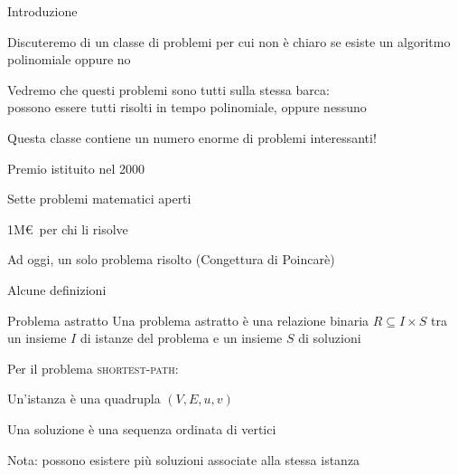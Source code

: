 \begin{frame}{Introduzione}

\BIL
\item Discuteremo di un classe di problemi per cui non è chiaro se esiste
un algoritmo polinomiale oppure no
\item Vedremo che questi problemi sono tutti sulla stessa barca:\\
  possono essere tutti risolti in tempo polinomiale, oppure nessuno
\item Questa classe contiene un numero enorme di problemi interessanti!
\EIL

\bigskip
{}
\BI
\item Premio istituito nel 2000
\item Sette problemi matematici aperti
\item 1M\euro\ per chi li risolve
\item Ad oggi, un solo problema risolto (Congettura di Poincarè)
\EI

\end{frame}


\begin{frame}{Alcune definizioni}

\vspace{-9pt}
\begin{block}{Problema astratto}
Una \alert{problema astratto} è una relazione binaria $R \subseteq I \times S$
tra un insieme $I$ di istanze del problema e un insieme $S$ di
soluzioni
\end{block}

\bigskip
{}
Per il problema \textsc{shortest-path}:
\BIL
\item Un'istanza è una quadrupla $(V,E,u,v)$
\item Una soluzione è una sequenza ordinata di vertici
\item Nota: possono esistere più soluzioni associate alla stessa istanza
\EIL

\end{frame}


